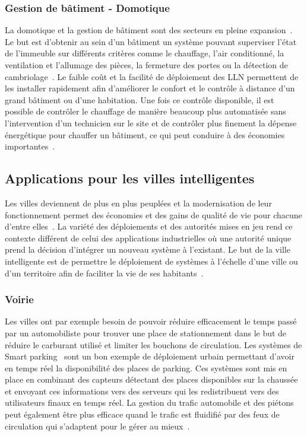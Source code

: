 \subsubsection{Gestion de bâtiment - Domotique}

La domotique et la gestion de bâtiment sont des secteurs en pleine expansion~\cite{martocci2010building, ehlers1996engery}.
Le but est d'obtenir au sein d'un bâtiment un système pouvant superviser l'état de l'immeuble sur différents critères comme le chauffage, l'air conditionné, la ventilation et l'allumage des pièces, la fermeture des portes ou la détection de cambriolage~\cite{mainwaring2002wireless}.
Le faible coût et la facilité de déploiement des \ac{LLN} permettent de les installer rapidement afin d'améliorer le confort et le contrôle à distance d'un grand bâtiment ou d'une habitation.
Une fois ce contrôle disponible, il est possible de contrôler le chauffage de manière beaucoup plus automatisée sans l'intervention d'un technicien sur le site et de contrôler plus finement la dépense énergétique pour chauffer un bâtiment, ce qui peut conduire à des économies importantes~\cite{egan2005emergence}.

\subsection{Applications pour les villes intelligentes}

Les villes deviennent de plus en plus peuplées et la modernisation de leur fonctionnement permet des économies et des gains de qualité de vie pour chacune d'entre elles~\cite{caragliu2011smart}.
La variété des déploiements et des autorités mises en jeu rend ce contexte différent de celui des applications industrielles où une autorité unique prend la décision d'intégrer un nouveau système à l'existant.
Le but de la ville intelligente est de permettre le déploiement de systèmes à l'échelle d'une ville ou d'un territoire afin de faciliter la vie de ses habitants~\cite{hollands2008will}.

\subsubsection{Voirie}

Les villes ont par exemple besoin de pouvoir réduire efficacement le temps passé par un automobiliste pour trouver une place de stationnement dans le but de réduire le carburant utilisé  et limiter les bouchons de circulation.
Les systèmes de Smart parking~\cite{medaglianibringing} sont un bon exemple de déploiement urbain permettant d'avoir en temps réel la disponibilité des places de parking.
Ces systèmes sont mis en place en combinant des capteurs détectant des places disponibles sur la chaussée et envoyant ces informations vers des serveurs qui les redistribuent vers des utilisateurs finaux en temps réel.
La gestion du trafic automobile et des piétons peut également être plus efficace quand le trafic est fluidifié par des feux de circulation qui s'adaptent pour le gérer au mieux~\cite{de1998optimal,faye2012distributed}.

